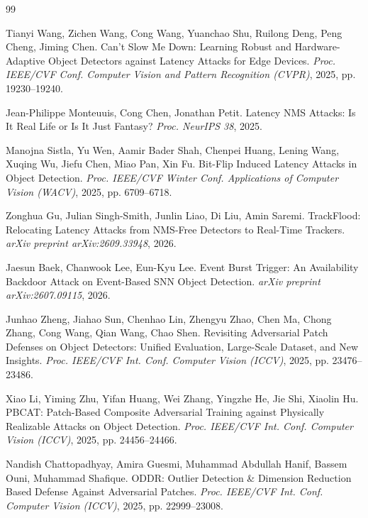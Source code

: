 \documentclass[a4paper,fleqn]{cas-dc}
\begin{document}
\begin{thebibliography}{99}

 Tianyi Wang, Zichen Wang, Cong Wang, Yuanchao Shu, Ruilong Deng, Peng Cheng, Jiming Chen. Can't Slow Me Down: Learning Robust and Hardware-Adaptive Object Detectors against Latency Attacks for Edge Devices. \emph{Proc. IEEE/CVF Conf. Computer Vision and Pattern Recognition (CVPR)}, 2025, pp. 19230--19240.

 Jean-Philippe Monteuuis, Cong Chen, Jonathan Petit. Latency NMS Attacks: Is It Real Life or Is It Just Fantasy? \emph{Proc. NeurIPS 38}, 2025.

 Manojna Sistla, Yu Wen, Aamir Bader Shah, Chenpei Huang, Lening Wang, Xuqing Wu, Jiefu Chen, Miao Pan, Xin Fu. Bit-Flip Induced Latency Attacks in Object Detection. \emph{Proc. IEEE/CVF Winter Conf. Applications of Computer Vision (WACV)}, 2025, pp. 6709--6718.

 Zonghua Gu, Julian Singh-Smith, Junlin Liao, Di Liu, Amin Saremi. TrackFlood: Relocating Latency Attacks from NMS-Free Detectors to Real-Time Trackers. \emph{arXiv preprint arXiv:2609.33948}, 2026.

 Jaesun Baek, Chanwook Lee, Eun-Kyu Lee. Event Burst Trigger: An Availability Backdoor Attack on Event-Based SNN Object Detection. \emph{arXiv preprint arXiv:2607.09115}, 2026.

 Junhao Zheng, Jiahao Sun, Chenhao Lin, Zhengyu Zhao, Chen Ma, Chong Zhang, Cong Wang, Qian Wang, Chao Shen. Revisiting Adversarial Patch Defenses on Object Detectors: Unified Evaluation, Large-Scale Dataset, and New Insights. \emph{Proc. IEEE/CVF Int. Conf. Computer Vision (ICCV)}, 2025, pp. 23476--23486.

 Xiao Li, Yiming Zhu, Yifan Huang, Wei Zhang, Yingzhe He, Jie Shi, Xiaolin Hu. PBCAT: Patch-Based Composite Adversarial Training against Physically Realizable Attacks on Object Detection. \emph{Proc. IEEE/CVF Int. Conf. Computer Vision (ICCV)}, 2025, pp. 24456--24466.

 Nandish Chattopadhyay, Amira Guesmi, Muhammad Abdullah Hanif, Bassem Ouni, Muhammad Shafique. ODDR: Outlier Detection \& Dimension Reduction Based Defense Against Adversarial Patches. \emph{Proc. IEEE/CVF Int. Conf. Computer Vision (ICCV)}, 2025, pp. 22999--23008.


\end{thebibliography}
\end{document}
